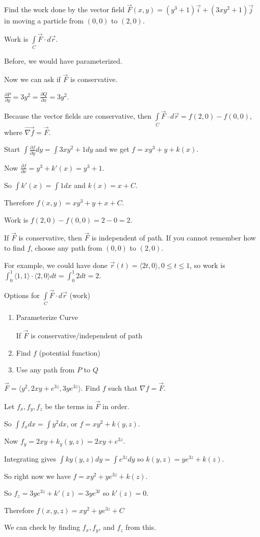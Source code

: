 \documentclass[../calc3.tex]{subfiles}
\begin{document}
\begin{example}
    Find the work done by the vector field $\vec{F}(x,y)=(y^3+1)\vec{i}+(3xy^2+1)\vec{j}$ in moving a particle from $(0,0)$ to $(2,0)$.

    Work is $\int\limits_{C}\vec{F}\cdot d\vec{r}$.

    Before, we would have parameterized.

    Now we can ask if $\vec{F}$ is conservative.

    $\frac{\partial P}{\partial y}=3y^2 = \frac{\partial Q}{\partial x}=3y^2$.

    Because the vector fields are conservative, then $\int\limits_{C}\vec{F}\cdot d\vec{r}=f(2,0)-f(0,0)$, where $\vec{\nabla f}=\vec{F}$.

    Start $\int \frac{\partial f}{\partial y}dy = \int 3xy^2+1 dy$ and we get $f=xy^3+y+k(x)$.

    Now $\frac{\partial f}{\partial x}=y^3+k'(x)=y^3+1$.

    So $\int k'(x)=\int 1 dx$ and $k(x)=x+C$.

    Therefore $f(x,y)=xy^3+y+x+C$.

    Work is $f(2,0)-f(0,0)=2-0=2$.
\end{example}

If $\vec{F}$ is conservative, then $\vec{F}$ is independent of path. If you cannot remember how to find $f$, choose any path from $(0,0)$ to $(2,0)$.

For example, we could have done $\vec{r}(t)=\langle 2t,0\rangle, 0\leq t\leq 1$, so work is $\int_0^1 \langle 1,1\rangle \cdot \langle 2,0\rangle dt = \int_0^1 2 dt = 2$.

Options for $\int\limits_{C} \vec{F}\cdot d\vec{r}$ (work)
\begin{enumerate}
    \item Parameterize Curve
    
    If $\vec{F}$ is conservative/independent of path 
    \item Find $f$ (potential function)
    \item Use any path from $P$ to $Q$
\end{enumerate}

\pagebreak
\begin{example}
    $\vec{F}=\langle y^2,2xy+e^{3z}, 3ye^{3z}\rangle$. Find $f$ such that $\nabla f = \vec{F}$.

    Let $f_x,f_y,f_z$ be the terms in $\vec{F}$ in order.

    So $\int f_x dx = \int y^2 dx$, or $f=xy^2+k(y,z)$.

    Now $f_y=2xy+k_y(y,z)=2xy+e^{3z}$.

    Integrating gives $\int ky(y,z)dy = \int e^{3z}dy$ so $k(y,z)=ye^{3z}+k(z)$.

    So right now we have $f=xy^2+ye^{3z}+k(z)$.

    So $f_z=3ye^{3z}+k'(z)=3ye^{3t}$ so $k'(z)=0$.

    Therefore $f(x,y,z)=xy^2+ye^{3z}+C$

    We can check by finding $f_x, f_y$, and $f_z$ from this.
\end{example}
\end{document}

